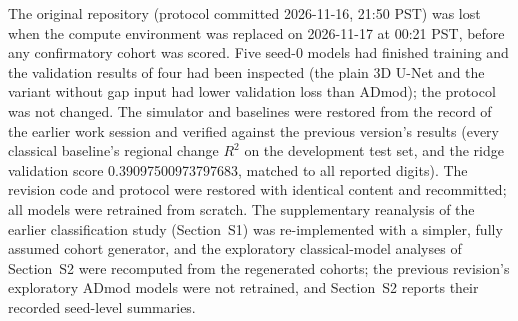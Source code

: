 The original repository (protocol committed 2026-11-16, 21:50 PST) was lost when the compute environment was replaced on 2026-11-17 at 00:21 PST, before any confirmatory cohort was scored. Five seed-0 models had finished training and the validation results of four had been inspected (the plain 3D U-Net and the variant without gap input had lower validation loss than ADmod); the protocol was not changed. The simulator and baselines were restored from the record of the earlier work session and verified against the previous version's results (every classical baseline's regional change $R^2$ on the development test set, and the ridge validation score 0.39097500973797683, matched to all reported digits). The revision code and protocol were restored with identical content and recommitted; all models were retrained from scratch. The supplementary reanalysis of the earlier classification study (Section~S1) was re-implemented with a simpler, fully assumed cohort generator, and the exploratory classical-model analyses of Section~S2 were recomputed from the regenerated cohorts; the previous revision's exploratory ADmod models were not retrained, and Section~S2 reports their recorded seed-level summaries.
